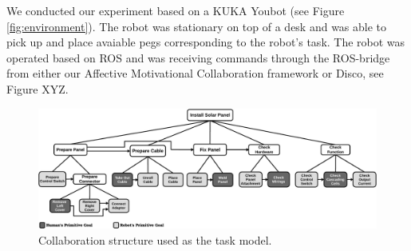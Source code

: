 \documentclass{sig-alternate-05-2015}
\begin{document}
We conducted our experiment based on a KUKA Youbot (see Figure
\ref{fig:environment}). The robot was stationary on top of a desk and was able
to pick up and place avaiable pegs corresponding to the robot's task. The robot
was operated based on ROS and was receiving commands through the ROS-bridge from
either our Affective Motivational Collaboration framework or Disco, see Figure
XYZ.

\begin{figure}
  \centering
  \includegraphics[width=1\textwidth]{figure/collaborationStructure.pdf}
  \caption{{\fontsize{9}{9}\selectfont Collaboration structure used as the
  task model.}}
  \label{fig:collaboration_structure}
\end{figure}
\end{document}
